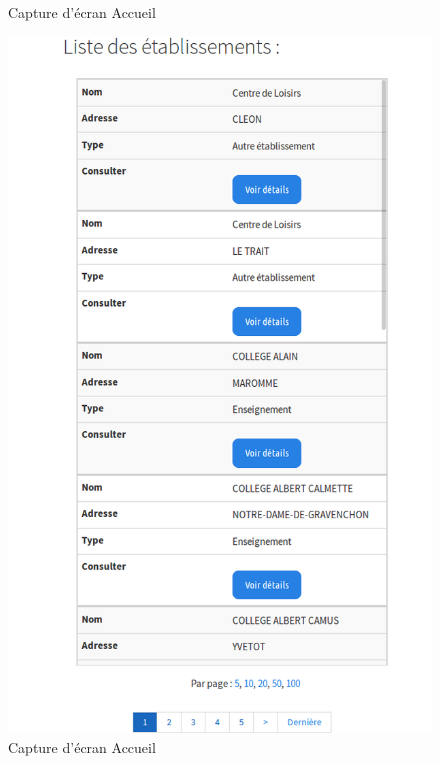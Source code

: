 \begin{frame}
\begin{multicols}{2}
\begin{figure}[!h]
\begin{center}
				\caption{Capture d'écran Accueil}
			\end{center}
		\end{figure}
		\begin{figure}[!h]
			\begin{center}
				\includegraphics[scale=0.16]{images/screenshot2.png}
				\caption{Capture d'écran Accueil}
			\end{center}
		\end{figure}
	\end{multicols}

\end{frame}

